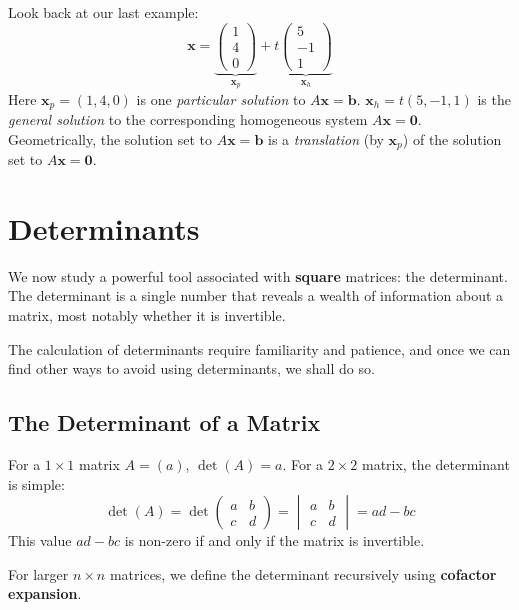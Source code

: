 \documentclass[oneside]{book}
\begin{document}
\begin{remark}
Look back at our last example:
\[ \mathbf{x} = \underbrace{\begin{pmatrix} 1 \\ 4 \\ 0 \end{pmatrix}}_{\mathbf{x}_p} + t \underbrace{\begin{pmatrix} 5 \\ -1 \\ 1 \end{pmatrix}}_{\mathbf{x}_h} \]
Here $\mathbf{x}_p = (1, 4, 0)$ is one \emph{particular solution} to $A\mathbf{x} = \mathbf{b}$.
$\mathbf{x}_h = t(5, -1, 1)$ is the \emph{general solution} to the corresponding homogeneous system $A\mathbf{x} = \mathbf{0}$.
Geometrically, the solution set to $A\mathbf{x} = \mathbf{b}$ is a \emph{translation} (by $\mathbf{x}_p$) of the solution set to $A\mathbf{x} = \mathbf{0}$.
% 
\end{remark}

\section{Determinants}

We now study a powerful tool associated with \textbf{square} matrices: the determinant. The determinant is a single number that reveals a wealth of information about a matrix, most notably whether it is invertible.

The calculation of determinants require familiarity and patience, and once we can find other ways to avoid using determinants, we shall do so.

\subsection{The Determinant of a Matrix}

For a $1 \times 1$ matrix $A = (a)$, $\det(A) = a$.
For a $2 \times 2$ matrix, the determinant is simple:
\[ \det(A) = \det \begin{pmatrix} a & b \\ c & d \end{pmatrix} = \begin{vmatrix} a & b \\ c & d \end{vmatrix} = ad - bc \]
This value $ad-bc$ is non-zero if and only if the matrix is invertible.

For larger $n \times n$ matrices, we define the determinant recursively using \textbf{cofactor expansion}.
\end{document}
